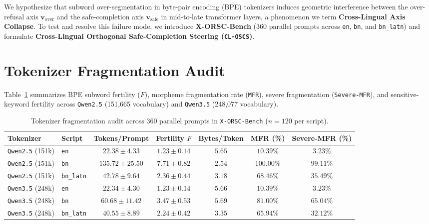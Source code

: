 \documentclass[11pt,a4paper]{article}
\begin{document}
We hypothesize that subword over-segmentation in byte-pair encoding (BPE) tokenizers induces geometric interference between the over-refusal axis $\mathbf{v}_{\text{over}}$ and the safe-completion axis $\mathbf{v}_{\text{safe}}$ in mid-to-late transformer layers, a phenomenon we term \textbf{Cross-Lingual Axis Collapse}. To test and resolve this failure mode, we introduce \textbf{X-ORSC-Bench} (360 parallel prompts across \texttt{en}, \texttt{bn}, and \texttt{bn\_latn}) and formulate \textbf{Cross-Lingual Orthogonal Safe-Completion Steering (\texttt{CL-OSCS})}.

\section{Tokenizer Fragmentation Audit}
Table~\ref{tab:tokenizer} summarizes BPE subword fertility ($F$), morpheme fragmentation rate (\texttt{MFR}), severe fragmentation (\texttt{Severe-MFR}), and sensitive-keyword fertility across \texttt{Qwen2.5} (151,665 vocabulary) and \texttt{Qwen3.5} (248,077 vocabulary).

\begin{table}[t]
\centering
\small
\begin{tabular}{llccccc}
\toprule
\textbf{Tokenizer} & \textbf{Script} & \textbf{Tokens/Prompt} & \textbf{Fertility $F$} & \textbf{Bytes/Token} & \textbf{MFR (\%)} & \textbf{Severe-MFR (\%)} \\
\midrule
\texttt{Qwen2.5} (151k) & \texttt{en} & $22.38 \pm 4.33$ & $1.23 \pm 0.14$ & $5.65$ & $10.39\%$ & $3.23\%$ \\
\texttt{Qwen2.5} (151k) & \texttt{bn} & $135.72 \pm 25.50$ & $7.71 \pm 0.82$ & $2.54$ & $100.00\%$ & $99.11\%$ \\
\texttt{Qwen2.5} (151k) & \texttt{bn\_latn} & $42.78 \pm 9.64$ & $2.36 \pm 0.44$ & $3.18$ & $68.46\%$ & $35.49\%$ \\
\midrule
\texttt{Qwen3.5} (248k) & \texttt{en} & $22.34 \pm 4.30$ & $1.23 \pm 0.14$ & $5.66$ & $10.39\%$ & $3.23\%$ \\
\texttt{Qwen3.5} (248k) & \texttt{bn} & $60.68 \pm 11.42$ & $3.47 \pm 0.53$ & $5.69$ & $81.00\%$ & $65.04\%$ \\
\texttt{Qwen3.5} (248k) & \texttt{bn\_latn} & $40.55 \pm 8.89$ & $2.24 \pm 0.42$ & $3.35$ & $65.94\%$ & $32.12\%$ \\
\bottomrule
\end{tabular}
\caption{Tokenizer fragmentation audit across 360 parallel prompts in \texttt{X-ORSC-Bench} ($n=120$ per script).}
\label{tab:tokenizer}
\end{table}
\end{document}
